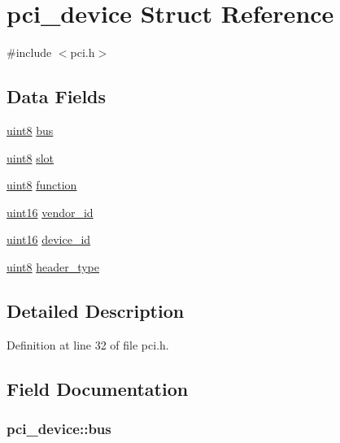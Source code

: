 \hypertarget{structpci__device}{
\section{pci\_\-device Struct Reference}
\label{structpci__device}
}


{\ttfamily \#include $<$pci.h$>$}

\subsection*{Data Fields}
\begin{DoxyCompactItemize}
\item 
\hyperlink{int__types_8h_adde6aaee8457bee49c2a92621fe22b79}{uint8} \hyperlink{structpci__device_ab2b4131a170671ca2abdf1c48b20bcc3}{bus}
\item 
\hyperlink{int__types_8h_adde6aaee8457bee49c2a92621fe22b79}{uint8} \hyperlink{structpci__device_a3b130ee93599464c3ef8512cb2a77097}{slot}
\item 
\hyperlink{int__types_8h_adde6aaee8457bee49c2a92621fe22b79}{uint8} \hyperlink{structpci__device_aa3a62446ea5e91d9d17f9200a14e7330}{function}
\item 
\hyperlink{int__types_8h_a05f6b0ae8f6a6e135b0e290c25fe0e4e}{uint16} \hyperlink{structpci__device_a6f02a7bd1fe6f83842830fe93c17f844}{vendor\_\-id}
\item 
\hyperlink{int__types_8h_a05f6b0ae8f6a6e135b0e290c25fe0e4e}{uint16} \hyperlink{structpci__device_acf4ab6914e188079b69a114b8435b0b5}{device\_\-id}
\item 
\hyperlink{int__types_8h_adde6aaee8457bee49c2a92621fe22b79}{uint8} \hyperlink{structpci__device_aa073d9d89b4ab12691bdef015834b17a}{header\_\-type}
\end{DoxyCompactItemize}


\subsection{Detailed Description}


Definition at line 32 of file pci.h.



\subsection{Field Documentation}
\hypertarget{structpci__device_ab2b4131a170671ca2abdf1c48b20bcc3}{
\subsubsection[{bus}]{ {\bf pci\_\-device::bus}}}
\label{structpci__device_ab2b4131a170671ca2abdf1c48b20bcc3}


